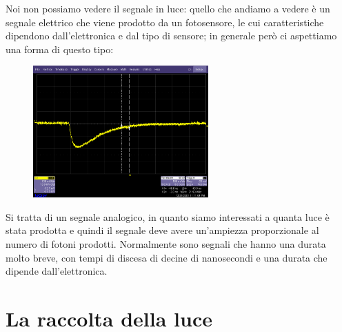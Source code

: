 Noi non possiamo vedere il segnale in luce: quello che andiamo a vedere è un segnale elettrico che viene prodotto da un fotosensore, le cui caratteristiche dipendono dall'elettronica e dal tipo di sensore; in generale però ci aspettiamo una forma di questo tipo:
\begin{figure}[H]
   \centering
   \includegraphics[width=0.6\textwidth]{immagini/segnale_scintillatore.png}
\end{figure}
Si tratta di un segnale analogico, in quanto siamo interessati a quanta luce è stata prodotta e quindi il segnale deve avere un'ampiezza proporzionale al numero di fotoni prodotti. Normalmente sono segnali che hanno una durata molto breve, con tempi di discesa di decine di nanosecondi e una durata che dipende dall'elettronica.

\section{La raccolta della luce}


